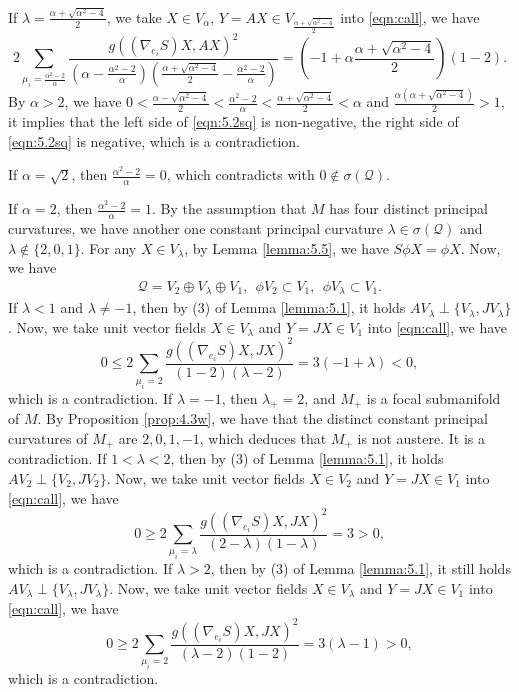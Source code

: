 \documentclass[reqno]{amsart}%
\theoremstyle{definition}
\numberwithin{equation}{section}
\begin{document}
If $\lambda=\frac{\alpha+\sqrt{\alpha^2-4}}{2}$,
we take $X\in V_\alpha$, $Y=AX\in V_{\frac{\alpha+\sqrt{\alpha^2-4}}{2}}$ into \eqref{eqn:call}, we have
\begin{equation}\label{eqn:5.2sq}
2\sum_{\mu_i=\tfrac{\alpha^2-2}{\alpha}}\frac{g((\nabla_{e_i} S)X,AX)^2}{(\alpha-\tfrac{\alpha^2-2}{\alpha})(\frac{\alpha+\sqrt{\alpha^2-4}}{2}-\tfrac{\alpha^2-2}{\alpha})}
=(-1+\alpha\frac{\alpha+\sqrt{\alpha^2-4}}{2})(1-2).
\end{equation}
By $\alpha>2$, we have $0<\frac{\alpha-\sqrt{\alpha^2-4}}{2}<\tfrac{\alpha^2-2}{\alpha}<\frac{\alpha+\sqrt{\alpha^2-4}}{2}
<\alpha$ and $\frac{\alpha(\alpha+\sqrt{\alpha^2-4})}{2}>1$, it implies that the left side of \eqref{eqn:5.2sq} is non-negative, the right side of \eqref{eqn:5.2sq} is negative, which is a contradiction.



If $\alpha=\sqrt{2}$, then $\tfrac{\alpha^2-2}{\alpha}=0$, which contradicts with $0\notin\sigma(\mathcal{Q})$.

If $\alpha=2$, then $\tfrac{\alpha^2-2}{\alpha}=1$. By the assumption that $M$ has four distinct principal curvatures, we have another one constant principal curvature $\lambda\in\sigma(\mathcal{Q})$ and $\lambda\notin\{2,0,1\}$. For any $X\in V_\lambda$, by Lemma \ref{lemma:5.5}, we have $S\phi X=\phi X$.
Now, we have
$$
\begin{aligned}
\mathcal{Q}=V_2\oplus V_\lambda\oplus V_1, \ \ \phi V_2\subset V_1,\ \ \phi V_\lambda\subset V_1.
\end{aligned}
$$
If $\lambda<1$ and $\lambda\neq-1$, then by (3) of Lemma \ref{lemma:5.1}, it holds
$AV_\lambda\perp \{V_\lambda,JV_\lambda\}$. Now, we take unit vector fields $X\in V_\lambda$ and $Y=JX\in V_1$ into \eqref{eqn:call}, we have
$$
0\leq2\sum_{\mu_i=2}\frac{g((\nabla_{e_i} S)X,JX)^2}{(1-2)(\lambda-2)}
=3(-1+\lambda)<0,
$$
which is a contradiction.
If $\lambda=-1$, then $\lambda_+=2$, and $M_+$ is a focal submanifold of $M$. By Proposition \ref{prop:4.3w}, we have that the distinct constant principal curvatures of $M_+$ are $2,0,1,-1$, which deduces that
$M_+$ is not austere. It is a contradiction.
If $1<\lambda<2$, then by (3) of Lemma \ref{lemma:5.1}, it holds
$AV_2\perp \{V_2,JV_2\}$. Now, we take unit vector fields $X\in V_2$ and $Y=JX\in V_1$ into \eqref{eqn:call}, we have
$$
0\geq2\sum_{\mu_i=\lambda}\frac{g((\nabla_{e_i} S)X,JX)^2}{(2-\lambda)(1-\lambda)}
=3>0,
$$
which is a contradiction. If $\lambda>2$, then by (3) of Lemma \ref{lemma:5.1}, it still holds
$AV_\lambda\perp \{V_\lambda,JV_\lambda\}$. Now, we take unit vector fields $X\in V_\lambda$ and $Y=JX\in V_1$ into \eqref{eqn:call}, we have
$$
0\geq2\sum_{\mu_i=2}\frac{g((\nabla_{e_i} S)X,JX)^2}{(\lambda-2)(1-2)}
=3(\lambda-1)>0,
$$
which is a contradiction.
\end{document}
